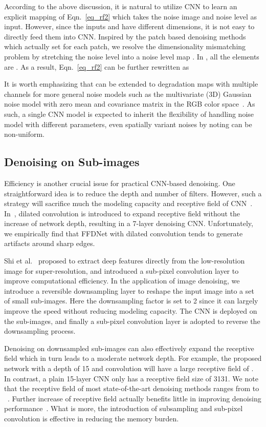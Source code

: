 \documentclass[journal]{IEEEtran}
\begin{document}
According to the above discussion, it is natural to utilize CNN to learn an explicit mapping of Eqn.~\eqref{eq_rf2} which takes the noise image and noise level as input.
However, since the inputs  and  have different dimensions, it is not easy to directly feed them into CNN.
Inspired by the patch based denoising methods which actually set  for each patch, we resolve the dimensionality mismatching problem by stretching the noise level  into a noise level map .
In , all the elements are . As a result, Eqn.~\eqref{eq_rf2} can be further rewritten as

It is worth emphasizing that  can be extended to degradation maps with multiple channels for more general noise models such as the multivariate (3D) Gaussian noise model  with zero mean and covariance matrix  in the RGB color space~\cite{Nam_2016_CVPR}.
As such, a single CNN model is expected to inherit the flexibility of handling noise model with different parameters, even spatially variant noises by noting  can be non-uniform.

\subsection{Denoising on Sub-images}

Efficiency is another crucial issue for practical CNN-based denoising. One straightforward idea is to reduce the depth and number of filters. However, such a strategy will sacrifice much the modeling capacity and receptive field of CNN~\cite{zhang2017beyond}.
In~\cite{zhang2017learning}, dilated convolution is introduced to expand receptive field without the increase of network depth, resulting in a 7-layer denoising CNN. Unfortunately, we empirically find that FFDNet with dilated convolution tends to generate artifacts around sharp edges.

Shi et al.~\cite{shi2016real} proposed to extract deep features directly from the low-resolution image for super-resolution, and introduced a sub-pixel convolution layer to improve computational efficiency. In the application of image denoising, we introduce a reversible downsampling layer to reshape the input image into a set of small sub-images. Here the downsampling factor is set to 2 since it can largely improve the speed without reducing modeling capacity. The CNN is deployed on the sub-images, and finally a sub-pixel convolution layer is adopted to reverse the downsampling process.

Denoising on downsampled sub-images can also effectively expand the receptive field which in turn leads to a moderate network depth. For example, the proposed network with a depth of 15 and  convolution will have a large receptive field of .
In contrast, a plain 15-layer CNN only has a receptive field size of 3131.
We note that the receptive field of most state-of-the-art denoising methods ranges from  to ~\cite{zhang2017beyond}.
Further increase of receptive field actually benefits little in improving denoising performance~\cite{levin2011natural}.
What is more, the introduction of subsampling and sub-pixel convolution is effective in reducing the memory burden.
\end{document}
